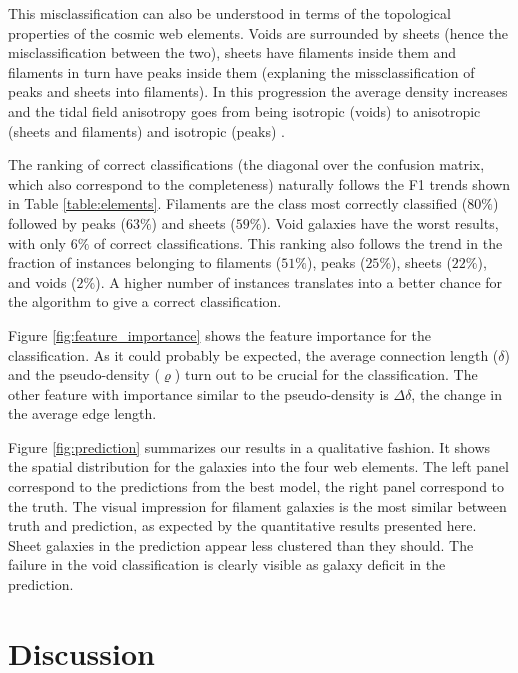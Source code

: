 \documentclass[usenatbib]{mnras}
\begin{document}
This misclassification can also be understood in terms of the topological properties of the cosmic web elements. 
Voids are surrounded by sheets (hence the misclassification between the two), sheets have filaments inside them and
filaments in turn have peaks inside them \citep{Cautun2014} (explaning the missclassification of peaks and sheets into filaments). 
In this progression the average density increases and the tidal field
anisotropy goes from being isotropic (voids) to anisotropic (sheets
and filaments) and isotropic (peaks) \citep{Bustamante2015}.


The ranking of correct classifications (the diagonal over the confusion matrix, which also correspond to the completeness) naturally follows the F1 trends shown in Table \ref{table:elements}.
Filaments are the class most correctly classified ($80\%$) followed by
peaks ($63\%$) and sheets ($59\%$).
Void galaxies have the worst results, with only $6\%$ of correct classifications.
This ranking also follows the trend in the fraction of instances belonging to
filaments ($51\%$), peaks ($25\%$), sheets ($22\%$), and voids ($2\%$).
A higher number of instances translates into a better chance for the
algorithm to give a correct classification. 

Figure \ref{fig:feature_importance} shows the feature
importance for the classification.
As it could probably be expected, the average connection length ($\delta$) and the pseudo-density ($\varrho$) turn out to be crucial for the classification.
The other feature with importance similar to the pseudo-density is  $\Delta \delta$, the change in the average edge length.


Figure \ref{fig:prediction} summarizes our results in a qualitative fashion.
It shows the spatial distribution for the galaxies into the four web
elements. 
The left panel correspond to the predictions from the best model, the right panel correspond to the truth.
The visual impression for filament galaxies is the most
similar between truth and prediction, as expected by the quantitative
results presented here.
Sheet galaxies in the prediction appear less clustered
than they should.
The failure in the void classification is clearly visible as galaxy deficit in the prediction.



\section{Discussion}\label{sec:discussion}
\end{document}

